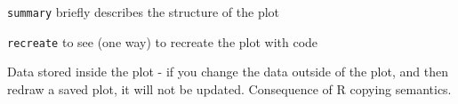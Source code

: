 {\tt summary} briefly describes the structure of the plot

{\tt recreate} to see (one way) to recreate the plot with code 

Data stored inside the plot - if you change the data outside of the plot, and then redraw a saved plot, it will not be updated.  Consequence of R copying semantics.



% 
% 
%   
%     
% 
